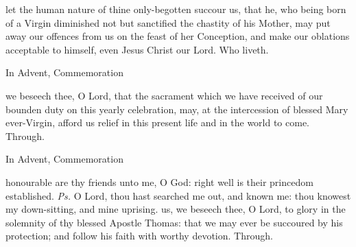 \secret
{} let the human nature of thine only-begotten succour us, that he, who being born of a Virgin diminished not but sanctified the chastity of his Mother, may put away our offences from us on the feast of her Conception, and make our oblations acceptable to himself, even Jesus Christ our Lord. Who liveth.
\begin{rubric}
    In Advent, Commemoration 
\end{rubric}


\postcommunion
{} we beseech thee, O Lord, that the sacrament which we have received of our bounden duty on this yearly celebration, may, at the intercession of blessed Mary ever-Virgin, afford us relief in this present life and in the world to come. Through.
\begin{rubric}
    In Advent, Commemoration 
\end{rubric}




\introit
{} honourable are thy friends unto me, O God: right well is their princedom established. \textit{Ps.} O Lord, thou hast searched me out, and known me: thou knowest my down-sitting, and mine uprising.
\collect
 us, we beseech thee, O Lord, to glory in the solemnity of thy blessed Apostle Thomas: that we may ever be succoured by his protection; and follow his faith with worthy devotion. Through.

